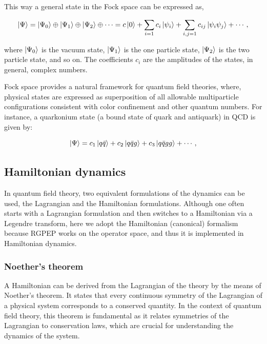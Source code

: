 \documentclass[11pt,a4paper,twoside,pdf]{article}
\numberwithin{equation}{section}
\begin{document}
This way a general state in the Fock space can be expressed as,

\begin{equation}
    \ket{\Psi} = \ket{\Psi_0} \oplus \ket{\Psi_1} \oplus
    \ket{\Psi_2} \oplus \cdots = c \ket{0} + \sum_{i=1}c_i \ket{\psi_i} +
    \sum_{i,j=1}c_{ij} \ket{\psi_i \psi_j} + \cdots,
\end{equation}

where $\ket{\Psi_0}$ is the vacuum state, $\ket{\Psi_1}$ is the one particle
state, $\ket{\Psi_2}$ is the two particle state, and so on. The coefficients $c_i$
are the amplitudes of the states, in general, complex numbers. 

Fock space provides a natural framework for quantum field theories, where, 
physical states are expressed as superposition of all allowable multiparticle 
configurations consistent with color confinement and other quantum numbers. 
For instance, a quarkonium state (a bound state of quark and antiquark) in QCD is 
given by:

\begin{equation}
    \ket{\Psi} = c_1 \ket{q\bar{q}} + c_2 \ket{q\bar{q}g} + c_3 \ket{q\bar{q}gg} + \cdots,
\end{equation}

\subsection{Hamiltonian dynamics}

In quantum field theory, two equivalent formulations of the dynamics can be used, 
the Lagrangian and the Hamiltonian formulations. Although one often starts with a 
Lagrangian formulation and then switches to a Hamiltonian via a Legendre transform, 
here we adopt the Hamiltonian (canonical) formalism because RGPEP works on the operator
space, and thus it is implemented in Hamiltonian dynamics.

\subsubsection{Noether's theorem}

A Hamiltonian can be derived from the Lagrangian of the theory by the means of Noether's
theorem\cite{Noether1918, Peskin:1995ev}. It states that every continuous 
symmetry of the Lagrangian of a physical system corresponds to a conserved quantity. 
In the context of quantum field theory, this theorem is fundamental as it relates 
symmetries of the Lagrangian to conservation laws, which are crucial for understanding 
the dynamics of the system.
\end{document}
